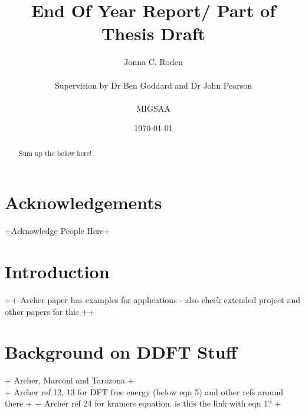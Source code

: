\documentclass[11pt, a4paper]{article}
\title{End Of Year Report/ Part of Thesis Draft}
\author{Jonna C. Roden\\ \\Supervision by Dr Ben Goddard and Dr John Pearson\\ \\ \vspace{0.5cm} MIGSAA}
\date{\today}
\theoremstyle{definition}
\begin{document}
	
	\maketitle
	\begin{abstract}
		Sum up the below here!
		
	\end{abstract}
	
	\newpage
	\section*{Acknowledgements}
	+Acknowledge People Here+
	\newpage
	\tableofcontents
	\newpage
















\section{Introduction}
++ Archer paper has examples for applications - also check extended project and other papers for this ++

\section{Background on DDFT Stuff}
+ Archer, Marconi and Tarazona  +\\
+ Archer ref 12, 13 for DFT free energy (below eqn 5) and other refs around there +
+ Archer ref 24 for kramers equation. is this the link with eqn 1? +
\end{document}
